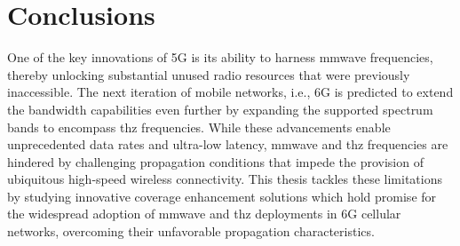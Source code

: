 \chapter{Conclusions}

One of the key innovations of 5G is its ability to harness \gls{mmwave} frequencies, thereby unlocking substantial unused radio resources that were previously inaccessible. The next iteration of mobile networks, i.e., 6G is predicted to extend the bandwidth capabilities even further by expanding the supported spectrum bands to encompass \gls{thz} frequencies. 
While these advancements enable unprecedented data rates and ultra-low latency, \gls{mmwave} and \gls{thz} frequencies are hindered by challenging propagation conditions that impede the provision of ubiquitous high-speed wireless connectivity.
This thesis tackles these limitations by studying innovative coverage enhancement solutions which hold promise for the widespread adoption of \gls{mmwave} and \gls{thz} deployments in 6G cellular networks, overcoming their unfavorable propagation characteristics.

